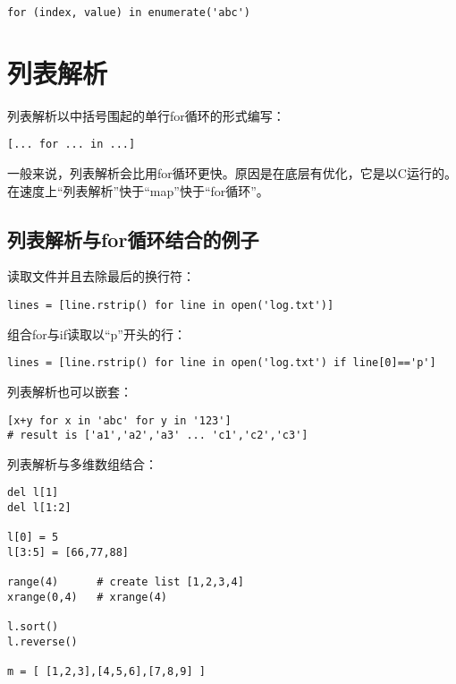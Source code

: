\begin{lstlisting}
for (index, value) in enumerate('abc')
\end{lstlisting}

\section{列表解析}

列表解析以中括号围起的单行for循环的形式编写：

\begin{lstlisting}
[... for ... in ...]
\end{lstlisting}

一般来说，列表解析会比用for循环更快。原因是在底层有优化，它是以C运行的。在速度上“列表解析”快于“map”快于“for循环”。

\subsection{列表解析与for循环结合的例子}

读取文件并且去除最后的换行符：

\begin{lstlisting}
lines = [line.rstrip() for line in open('log.txt')]
\end{lstlisting}

组合for与if读取以“p”开头的行：

\begin{lstlisting}
lines = [line.rstrip() for line in open('log.txt') if line[0]=='p'] 
\end{lstlisting}

列表解析也可以嵌套：

\begin{lstlisting}
[x+y for x in 'abc' for y in '123']
# result is ['a1','a2','a3' ... 'c1','c2','c3']
\end{lstlisting}

列表解析与多维数组结合：

\begin{lstlisting}
del l[1]
del l[1:2]

l[0] = 5
l[3:5] = [66,77,88]

range(4)      # create list [1,2,3,4]
xrange(0,4)   # xrange(4)

l.sort()
l.reverse()

m = [ [1,2,3],[4,5,6],[7,8,9] ]
\end{lstlisting}
